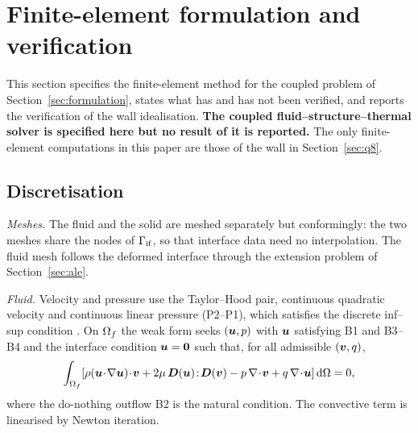 \section{Finite-element formulation and verification}
\label{sec:fem}

This section specifies the finite-element method for the coupled problem of Section~\ref{sec:formulation},
states what has and has not been verified, and reports the verification of the wall idealisation.
\textbf{The coupled fluid--structure--thermal solver is specified here but no result of it is reported.}
The only finite-element computations in this paper are those of the wall in
Section~\ref{sec:q8}.

\subsection{Discretisation}
\label{sec:fe}
\emph{Meshes.} The fluid and the solid are meshed separately but conformingly: the two meshes share the
nodes of $\Gamma_{\mathrm{if}}$, so that interface data need no interpolation. The fluid mesh follows the
deformed interface through the extension problem of Section~\ref{sec:ale}.

\emph{Fluid.} Velocity and pressure use the Taylor--Hood pair, continuous quadratic velocity and
continuous linear pressure (P2--P1), which satisfies the discrete inf--sup condition
\citep{hood1974navier,brezzi1991mixed}. On $\Omega_f$ the weak form seeks $(\bm{u},p)$ with $\bm{u}$ satisfying B1
and B3--B4 and the interface condition $\bm{u}=\bm0$ such that, for all admissible $(\bm{v},q)$,
\begin{equation}
\int_{\Om_f}\!\left[\rho(\bu\!\cdot\!\nabla\bu)\!\cdot\!\bv+2\mu\,\bD(\bu)\!:\!\bD(\bv)-p\,\nabla\!\cdot\!\bv+q\,\nabla\!\cdot\!\bu\right]\dd\Om=0,
\label{eq:wkfluid}
\end{equation}
where the do-nothing outflow B2 is the natural condition. The convective term is linearised by Newton
iteration.

